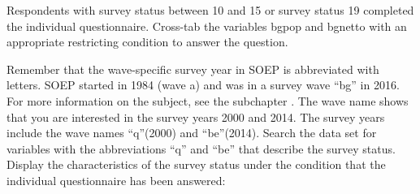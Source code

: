 \documentclass[letterpaper,10pt,openany,onesideH,english]{sphinxmanual}
\begin{document}
\begin{figure}[H]
\centering

\noindent{}
\end{figure}

Respondents with survey status between 10 and 15 or survey status 19 completed the individual questionnaire. Cross-tab the variables bgpop and bgnetto with an appropriate restricting condition to answer the question.

%
\begin{sphinxVerbatim}[commandchars=\\\{\},numbers=left,firstnumber=1,stepnumber=1]
                
\end{sphinxVerbatim}

\begin{figure}[H]
\centering

\noindent{}
\end{figure}



Remember that the wave-specific survey year in SOEP is abbreviated with letters. SOEP started in 1984 (wave a) and was in a survey wave “bg” in 2016. For more information on the subject, see the subchapter {\hyperref[\detokenize{Principles of Data Structure/index:label}]{}}.
The wave name shows that you are interested in the survey years 2000 and 2014. The survey years include the wave names “q”(2000) and “be”(2014). Search the data set for variables with the abbreviations “q” and “be” that describe the survey status. Display the characteristics of the survey status under the condition that the individual questionnaire has been answered:
\end{document}
